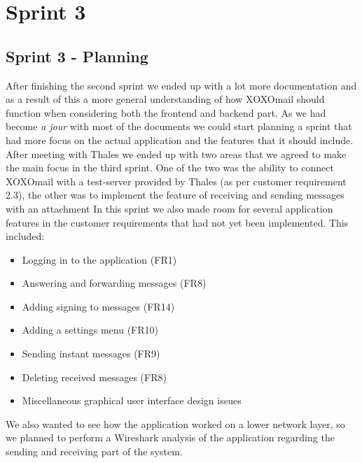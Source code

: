 \chapter{Sprint 3}

\section{Sprint 3 - Planning}
After finishing the second sprint we ended up with a lot more documentation and as a result of this a more general understanding of how XOXOmail should function when considering both the frontend and backend part. As we had become \textit{a jour} with most of the documents we could start planning a sprint that had more focus on the actual application and the features that it should include. 
\newline
\newline
After meeting with Thales we ended up with two areas that we agreed to make the main focus in the third sprint. One of the two was the ability to connect XOXOmail with a test-server provided by Thales (as per customer requirement 2.3), the other was to implement the feature of receiving and sending messages with an attachment
\newline
\newline
In this sprint we also made room for several application features in the customer requirements that had not yet been implemented. This included:
\begin{itemize}
\item{}Logging in to the application (FR1)
\item{}Answering and forwarding messages (FR8)
\item{}Adding signing to messages (FR14)
\item{}Adding a settings menu (FR10)
\item{}Sending instant messages (FR9)
\item{}Deleting received messages (FR8)
\item{}Miscellaneous graphical user interface design issues
\end{itemize}

We also wanted to see how the application worked on a lower network layer, so we planned to perform a Wireshark analysis of the application regarding the sending and receiving part of the system. 

\newpage

